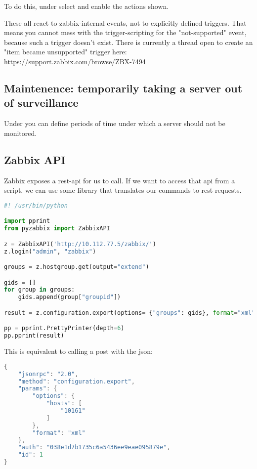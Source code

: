 To do this, under  select  and enable the actions shown.

These all react to zabbix-internal events, not to explicitly defined triggers. That means you cannot mess with the trigger-scripting for the "not-supported" event, because such a trigger doesn't exist. There is currently a thread open to create an "item became unsupported" trigger here: https://support.zabbix.com/browse/ZBX-7494



\subsection{Maintenence: temporarily taking a server out of surveillance}
Under  you can define periods of time under which a server should not be monitored. 




\subsection{Zabbix API}
Zabbix exposes a rest-api for us to call. If we want to access that api from a script, we can use some library that translates our commands to rest-requests. 

\begin{lstlisting}[language=python]
#! /usr/bin/python

import pprint
from pyzabbix import ZabbixAPI

z = ZabbixAPI('http://10.112.77.5/zabbix/')
z.login("admin", "zabbix")

groups = z.hostgroup.get(output="extend")

gids = []
for group in groups:
    gids.append(group["groupid"])

result = z.configuration.export(options= {"groups": gids}, format="xml")

pp = pprint.PrettyPrinter(depth=6)
pp.pprint(result)
\end{lstlisting}

This is equivalent to calling a post with the json: 

\begin{lstlisting}[language=java]
{
    "jsonrpc": "2.0",
    "method": "configuration.export",
    "params": {
        "options": {
            "hosts": [
                "10161"
            ]
        },
        "format": "xml"
    },
    "auth": "038e1d7b1735c6a5436ee9eae095879e",
    "id": 1
}
\end{lstlisting}